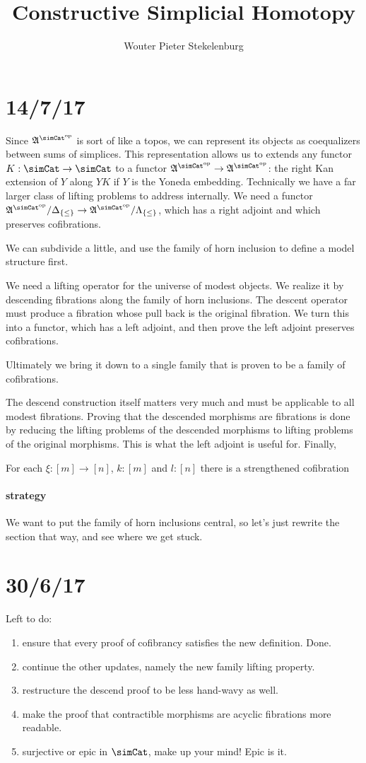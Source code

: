 \documentclass{tac}
\title{Constructive Simplicial Homotopy}
\author{Wouter Pieter Stekelenburg}
\newcommand\set[1]{\left\{#1\right\}}
\newcommand\dual{^{\mathrm{op}}}
\newcommand\s{^{\simCat\dual}}
\newcommand\of{:}
\newcommand\simplex\Delta
\newcommand\horn\Lambda
\newcommand\ambient{\mathfrak A}
\begin{document}
\section{14/7/17}
Since $\ambient\s$ is sort of like a topos, we can represent its objects as coequalizers between sums of simplices. This representation allows us to extends any functor $K\of \simCat \to \simCat$ to a functor $\ambient\s\to\ambient\s$: the right Kan extension of $Y$ along $YK$ if $Y$ is the Yoneda embedding.
Technically we have a far larger class of lifting problems to address internally. We need a functor $\ambient\s/\simplex_{\set\leq}\to\ambient\s/\horn_{\set\leq}$, which has a right adjoint and which preserves cofibrations.

We can subdivide a little, and use the family of horn inclusion to define a model structure first.

We need a lifting operator for the universe of modest objects. We realize it by descending fibrations along the family of horn inclusions. The descent operator must produce a fibration whose pull back is the original fibration. We turn this into a functor, which has a left adjoint, and then prove the left adjoint preserves cofibrations.

Ultimately we bring it down to a single family that is proven to be a family of cofibrations.

The descend construction itself matters very much and must be applicable to all modest fibrations.
Proving that the descended morphisms are fibrations is done by reducing the lifting problems of the descended morphisms to lifting problems of the original morphisms. This is what the left adjoint is useful for. Finally, 


For each $\xi\of [m]\to[n]$, $k\of[m]$ and $l\of[n]$ there is a strengthened cofibration 

\paragraph{strategy}
We want to put the family of horn inclusions central, so let's just rewrite the section that way, and see where we get stuck.





\section{30/6/17}
Left to do:
\begin{enumerate}
\item ensure that every proof of cofibrancy satisfies the new definition.
Done.

\item continue the other updates, namely the new family lifting property.
\item restructure the descend proof to be less hand-wavy as well.

\item make the proof that contractible morphisms are acyclic fibrations more readable.
\item surjective or epic in $\simCat$, make up your mind!
Epic is it.
\end{enumerate}
\end{document}
